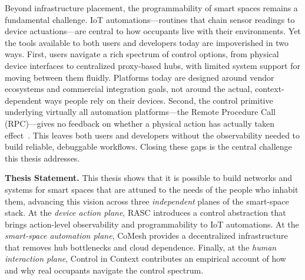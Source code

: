 Beyond infrastructure placement, the programmability of smart spaces remains a fundamental challenge. IoT automations---routines that chain sensor readings to device actuations\allowbreak ---are central to how occupants live with their environments. Yet the tools available to both users and developers today are impoverished in two ways. First, users navigate a rich spectrum of control options, from physical device interfaces to centralized proxy-based hubs, with limited system support for moving between them fluidly. Platforms today are designed around vendor ecosystems and commercial integration goals, not around the actual, context-dependent ways people rely on their devices. Second, the control primitive underlying virtually all automation platforms---the Remote Procedure Call (RPC)---gives no feedback on whether a physical action has actually taken effect~\cite{birrell1984implementing}. This leaves both users and developers without the observability needed to build reliable, debuggable workflows. Closing these gaps is the central challenge this thesis addresses.


\smallskip\noindent\textbf{Thesis Statement.}
This thesis shows that it is possible to build networks and systems for smart spaces that are attuned to the needs of the people who inhabit them, advancing this vision across three \emph{independent} planes of the smart-space stack. At the \emph{device action plane}, RASC introduces a control abstraction that brings action-level observability and programmability to IoT automations. At the \emph{smart-space automation plane}, CoMesh provides a decentralized infrastructure that removes hub bottlenecks and cloud dependence. Finally, at the \emph{human interaction plane}, Control in Context contributes an empirical account of how and why real occupants navigate the control spectrum.


